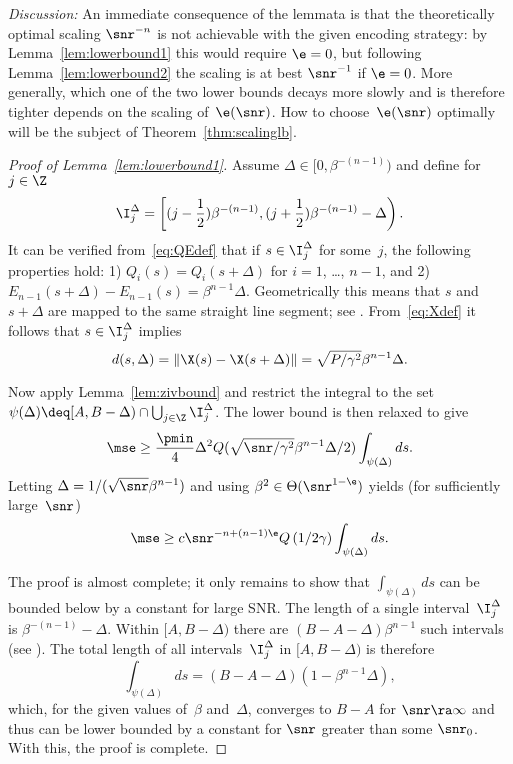 \emph{Discussion:} An immediate consequence of the lemmata is that the
theoretically optimal scaling $\snr^{-n}$ is not achievable with the given
encoding strategy: by Lemma~\ref{lem:lowerbound1} this would require $\e = 0$,
but following Lemma~\ref{lem:lowerbound2} the scaling is at best $\snr^{-1}$ if
$\e = 0 $.  More generally, which one of the two lower bounds decays more slowly
and is therefore tighter depends on the scaling of~$\e(\snr)$. How to
choose~$\e(\snr)$ optimally will be the subject of Theorem~\ref{thm:scalinglb}.

\begin{proof}[Proof of Lemma~\ref{lem:lowerbound1}]
  Assume $\Delta \in [0, \beta^{-(n-1)})$ and define for $j \in \Z$
  \[ \I_j^\Delta = \left[ (j - \frac12 )\beta^{-(n-1)}, 
    (j + \frac12 ) \beta^{-(n-1)} - \Delta \right).\]
  It can be verified from~\eqref{eq:QEdef} that if $s \in \I_j^\Delta$ for
  some~$j$, the following properties hold: 1) $Q_i(s) = Q_i(s+\Delta)$ for
  $i=1$, \dots, $n-1$, and 2) $E_{n-1}(s+\Delta) - E_{n-1}(s) =
  \beta^{n-1}\Delta$. Geometrically this means that $s$ and~$s + \Delta$ are
  mapped to the same straight line segment; see .
  From~\eqref{eq:Xdef} it follows that $s \in \I_j^\Delta$ implies
  \begin{equation*}
    d(s, \Delta) = \|\X(s) - \X(s+\Delta)\| = \sqrt{P/\gamma^2}
    \beta^{n-1}\Delta.
  \end{equation*}

  Now apply Lemma~\ref{lem:zivbound} and restrict the integral to the
  set~$\psi(\Delta) \deq [A,B-\Delta) \cap \bigcup_{j\in\Z} \I_j^\Delta$. The
  lower bound is then relaxed to give
  \begin{equation*}
    \mse \ge \frac{\pmin}{4} \Delta^2 Q(\sqrt{\snr/\gamma^2} \beta^{n-1}
    \Delta/2) \int_{\psi(\Delta)} ds.
  \end{equation*}
  Letting $\Delta = 1/(\sqrt{\snr}\beta^{n-1})$ and using $\beta^2 \in
  \Theta(\snr^{1-\e})$ yields (for sufficiently large~$\snr$)
  \begin{equation*}
    \mse \ge c \snr^{-n+(n-1)\e} Q\left(1/2\gamma\right)
    \int_{\psi(\Delta)} ds.
  \end{equation*}

  The proof is almost complete; it only remains to show that
  $\int_{\psi(\Delta)}ds$ can be bounded below by a constant for large SNR. The
  length of a single interval~$\I_j^\Delta$ is $\beta^{-(n-1)} - \Delta$. Within
  $[A,B-\Delta)$ there are $(B-A-\Delta)\beta^{n-1}$ such intervals (see
  ). The total
  length of all intervals~$\I_j^\Delta$ in $[A, B-\Delta)$ is therefore
  \[ \int_{\psi(\Delta)} ds = (B-A-\Delta)
  (1 - \beta^{n-1}\Delta), \]
  which, for the given values of~$\beta$ and~$\Delta$, 
  converges to $B-A$ for $\snr \ra \infty$ and thus can be lower bounded by a
  constant for $\snr$ greater than some $\snr_0$. With this, the proof is
  complete.
\end{proof}

